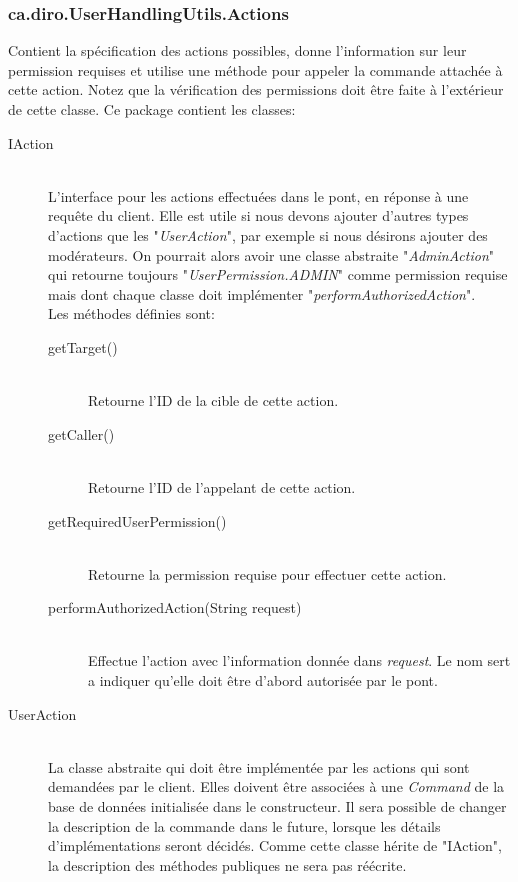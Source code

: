 \documentclass[10pt,a4paper]{report}
\begin{document}
\begin{flushleft}
\subsubsection*{ca.diro.UserHandlingUtils.Actions}
Contient la spécification des actions possibles, donne l'information sur leur permission requises et utilise une méthode pour appeler la commande attachée à cette action. Notez que la vérification des permissions doit être faite à l'extérieur de cette classe. Ce package contient les classes:\\
\begin{description}
\item[IAction] \hfill \\ L'interface pour les actions effectuées dans le pont, en réponse à une requête du client. Elle est utile si nous devons ajouter d'autres types d'actions que les "\emph{UserAction}", par exemple si nous désirons ajouter des modérateurs. On pourrait alors avoir une classe abstraite "\emph{AdminAction}" qui retourne toujours "\emph{UserPermission.ADMIN}" comme permission requise mais dont chaque classe doit implémenter "\emph{performAuthorizedAction}".\\
\medskip
Les méthodes définies sont:\\
\bigskip
\begin{description}
\item[getTarget()] \hfill \\ Retourne l'ID de la cible de cette action.
\item[getCaller()] \hfill \\ Retourne l'ID de l'appelant de cette action.
\item[getRequiredUserPermission()] \hfill \\ Retourne la permission requise pour effectuer cette action.
\item[performAuthorizedAction(String request)] \hfill \\ Effectue l'action avec l'information donnée dans \emph{request}. Le nom sert a indiquer qu'elle doit être d'abord autorisée par le pont.
\end{description}
\item[UserAction] \hfill \\ La classe abstraite qui doit être implémentée par les actions qui sont demandées par le client. Elles doivent être associées à une \emph{Command} de la base de données initialisée dans le constructeur. Il sera possible de changer la description de la commande dans le future, lorsque les détails d'implémentations seront décidés. Comme cette classe hérite de "IAction", la description des méthodes publiques ne sera pas réécrite.

\end{description}
\end{flushleft}
\end{document}
